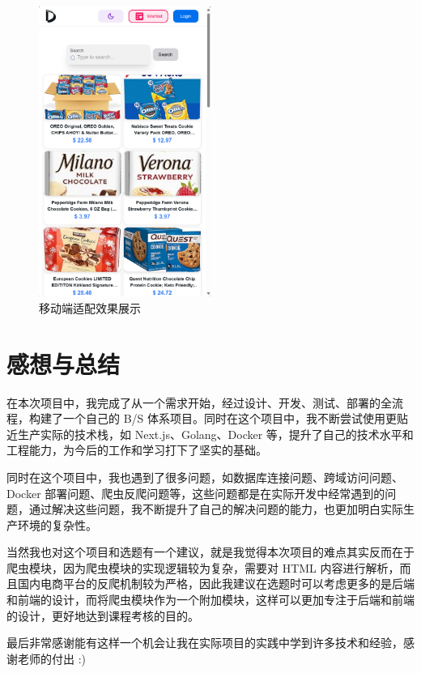 \begin{figure}[H]
\centering
\includegraphics[width=0.5\textwidth]{assets/report/mobile.png}
\caption{移动端适配效果展示}
\end{figure}

\chapter{感想与总结}

在本次项目中，我完成了从一个需求开始，经过设计、开发、测试、部署的全流程，构建了一个自己的 B/S 体系项目。同时在这个项目中，我不断尝试使用更贴近生产实际的技术栈，如 Next.js、Golang、Docker 等，提升了自己的技术水平和工程能力，为今后的工作和学习打下了坚实的基础。

同时在这个项目中，我也遇到了很多问题，如数据库连接问题、跨域访问问题、Docker 部署问题、爬虫反爬问题等，这些问题都是在实际开发中经常遇到的问题，通过解决这些问题，我不断提升了自己的解决问题的能力，也更加明白实际生产环境的复杂性。

当然我也对这个项目和选题有一个建议，就是我觉得本次项目的难点其实反而在于爬虫模块，因为爬虫模块的实现逻辑较为复杂，需要对 HTML 内容进行解析，而且国内电商平台的反爬机制较为严格，因此我建议在选题时可以考虑更多的是后端和前端的设计，而将爬虫模块作为一个附加模块，这样可以更加专注于后端和前端的设计，更好地达到课程考核的目的。

最后非常感谢能有这样一个机会让我在实际项目的实践中学到许多技术和经验，感谢老师的付出 :)
